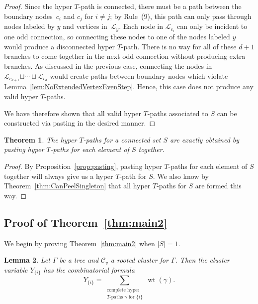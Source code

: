 \documentclass[pdftex]{sigma}
\numberwithin{equation}{section}
\newtheorem{Theorem}{Theorem}[section]
\newtheorem{Lemma}[Theorem]{Lemma}
\DeclareMathOperator{\wt}{wt}
\newcommand{\new}[1]{{#1}}
\newcommand{\calC}{\mathcal{C}}
\begin{document}
\begin{proof}
Since the hyper $T$-path is connected, there must be a path between the boundary nodes~$c_i$ and $c_j$ for $i \neq j$; by Rule~(9), this path can only pass through nodes labeled by $y$ and vertices in~$\mathcal{L}_{y}$. Each node in $\mathcal{L}_{c_i}$ can only be incident to one odd connection, so connecting these nodes to one of the nodes labeled $y$ would produce a disconnected hyper $T$-path. There is no way for all of these $d+1$ branches to come together in the next odd connection without producing extra branches. As discussed in the previous case, connecting the nodes in $\mathcal{L}_{c_{k+1}} \new{\sqcup \cdots \sqcup} \mathcal{L}_{c_d}$ would create paths between boundary nodes which violate Lemma~\ref{lem:NoExtendedVertexEvenStep}. Hence, this case does not produce any valid hyper $T$-paths.

We have therefore shown that all valid hyper $T$-paths associated to $S$ can be constructed via pasting in the desired manner.
\end{proof}

\begin{Theorem}
The hyper $T$-paths for a connected set $S$ are exactly obtained by pasting hyper $T$-paths for each element of $S$ together.
\end{Theorem}

\begin{proof}
By Proposition~\ref{prop:pasting}, pasting hyper $T$-paths for each element of $S$ together will always give us a hyper $T$-path for $S$. We also know by Theorem~\ref{thm:CanPeelSingleton} that all hyper $T$-paths for $S$ are formed this way.
\end{proof}

\subsection{Proof of Theorem~\ref{thm:main2}}\label{sec:pf-thm-2}

We begin by proving Theorem~\ref{thm:main2} when $|S|=1$.

\begin{Lemma}
Let $\Gamma$ be a tree and $\calC_v$ a rooted cluster for $\Gamma$. Then the cluster variable $Y_{\{i\}}$ has the combinatorial formula \[ Y_{\{i\}}=\sum_{\substack{\text{complete hyper}\\T\text{-paths }\gamma\text{ for }\{i\}}}\wt(\gamma).\]
\end{Lemma}
\end{document}
